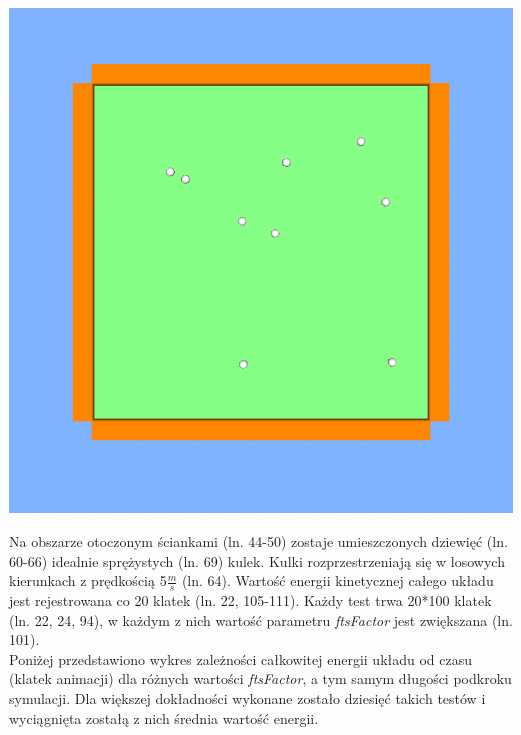 \begin{center}
\includegraphics[scale = 0.5]{./img/shot_2.png}
\end{center}


  
Na obszarze otoczonym ściankami (ln. 44-50) zostaje umieszczonych dziewięć (ln.
60-66) idealnie sprężystych (ln. 69) kulek. Kulki rozprzestrzeniają się w
losowych kierunkach z prędkością 5$ \frac{m}{s} $ (ln. 64). Wartość energii
kinetycznej całego układu jest rejestrowana co 20 klatek (ln. 22, 105-111).
Każdy test trwa 20*100 klatek (ln. 22, 24, 94), w każdym z nich wartość
parametru \emph{ftsFactor} jest zwiększana (ln. 101).\\
Poniżej przedstawiono wykres zależności całkowitej energii układu od
czasu (klatek animacji) dla różnych wartości \emph{ftsFactor}, a tym samym
długości podkroku symulacji. Dla większej dokładności wykonane zostało dziesięć
takich testów i wyciągnięta zostałą z nich średnia wartość energii.



